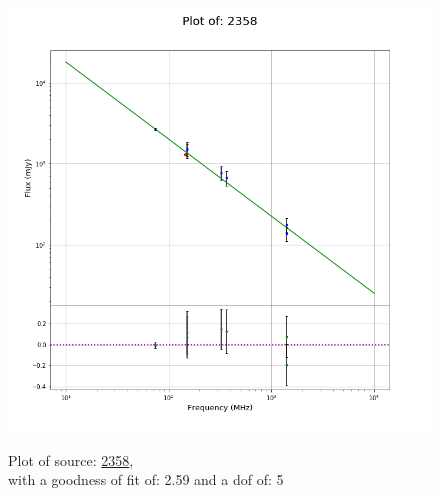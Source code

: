\documentclass{article}
\begin{document}
\begin{figure}[H]
    \centering
    \begin{minipage}{.5\textwidth}
        \centering
        \includegraphics[scale = 0.35]{KmeulenTrap4P23_1hr/1hr2358.png}
        \captionsetup{labelformat=empty}
        \caption{Plot of source: \href{http://banana.transientskp.org/r4/vlo_KmeulenTrap4P23/runningcatalog/2358}{2358},\\with a goodness of fit of: 2.59 and a dof of: 5}
        \addtocounter{figure}{-1}
        \label{KmeulenTrap4P23:1hr:2358:plot}
    \end{minipage}%
    \begin{minipage}{0.5\textwidth}
        \centering


\end{minipage}
\end{figure}
\end{document}
